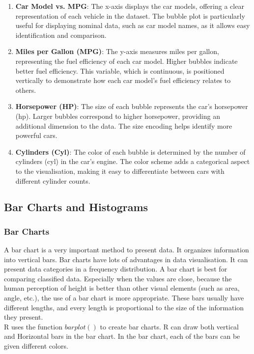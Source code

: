 \documentclass{article}\usepackage[]{graphicx}\usepackage[]{xcolor}
\begin{document}
\begin{enumerate}
\item \textbf{Car Model vs. MPG}: The x-axis displays the car models, offering a clear representation of each vehicle in the dataset. The bubble plot is particularly useful for displaying nominal data, such as car model names, as it allows easy identification and comparison.
\item \textbf{Miles per Gallon (MPG)}: The y-axis measures miles per gallon, representing the fuel efficiency of each car model. Higher bubbles indicate better fuel efficiency. This variable, which is continuous, is positioned vertically to demonstrate how each car model's fuel efficiency relates to others.
\item \textbf{Horsepower (HP)}: The size of each bubble represents the car's horsepower (hp). Larger bubbles correspond to higher horsepower, providing an additional dimension to the data. The size encoding helps identify more powerful cars.
\item \textbf{Cylinders (Cyl)}: The color of each bubble is determined by the number of cylinders (cyl) in the car's engine. The color scheme adds a categorical aspect to the visualisation, making it easy to differentiate between cars with different cylinder counts.
\end{enumerate}


\subsection{Bar Charts and Histograms}
\subsubsection{Bar Charts}
A bar chart is a very important method to present data. It organizes information into vertical bars.  Bar charts have lots of advantages in data visualisation. It can present data categories in a frequency distribution. A bar chart is best for comparing classified data. Especially when the values are close, because the human perception of height is better than other visual elements (such as area, angle, etc.), the use of a bar chart is more appropriate. These bars usually have different lengths, and every length is proportional to the size of the information they present.\\

\noindent
R uses the function $barplot()$ to create bar charts. R can draw both vertical and Horizontal bars in the bar chart. In the bar chart, each of the bars can be given different colors.\\
\end{document}

